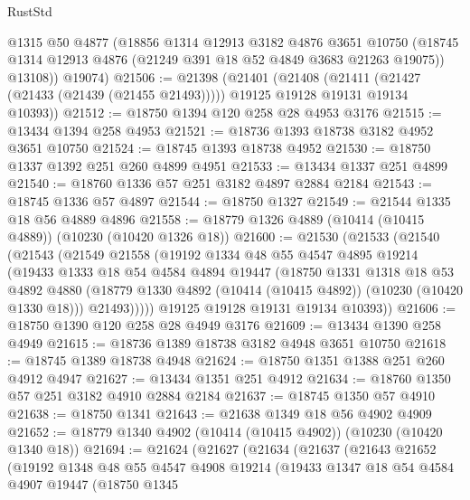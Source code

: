 \begin{lexlean}{RustStd}
\begin{coremodule}
        @1315
        @50
        @4877
        (@18856
          @1314
          @12913
          @3182
          @4876
          @3651
          @10750
          (@18745 @1314 @12913 @4876 (@21249 @391 @18 @52 @4849 @3683 @21263 @19075))
          @13108))
      @19074)
@21506 := @21398
    (@21401
      (@21408
        (@21411 (@21427 (@21433 (@21439 (@21455 @21493)))))
        @19125
        @19128
        @19131
        @19134
        @10393))
@21512 := @18750 @1394 @120 @258 @28 @4953 @3176
@21515 := @13434 @1394 @258 @4953
@21521 := @18736 @1393 @18738 @3182 @4952 @3651 @10750
@21524 := @18745 @1393 @18738 @4952
@21530 := @18750 @1337 @1392 @251 @260 @4899 @4951
@21533 := @13434 @1337 @251 @4899
@21540 := @18760 @1336 @57 @251 @3182 @4897 @2884 @2184
@21543 := @18745 @1336 @57 @4897
@21544 := @18750 @1327
@21549 := @21544 @1335 @18 @56 @4889 @4896
@21558 := @18779 @1326 @4889 (@10414 (@10415 @4889)) (@10230 (@10420 @1326 @18))
@21600 := @21530
    (@21533
      (@21540
        (@21543
          (@21549
            @21558
            (@19192
              @1334
              @48
              @55
              @4547
              @4895
              @19214
              (@19433
                @1333
                @18
                @54
                @4584
                @4894
                @19447
                (@18750
                  @1331
                  @1318
                  @18
                  @53
                  @4892
                  @4880
                  (@18779 @1330 @4892 (@10414 (@10415 @4892)) (@10230 (@10420 @1330 @18)))
                  @21493)))))
        @19125
        @19128
        @19131
        @19134
        @10393))
@21606 := @18750 @1390 @120 @258 @28 @4949 @3176
@21609 := @13434 @1390 @258 @4949
@21615 := @18736 @1389 @18738 @3182 @4948 @3651 @10750
@21618 := @18745 @1389 @18738 @4948
@21624 := @18750 @1351 @1388 @251 @260 @4912 @4947
@21627 := @13434 @1351 @251 @4912
@21634 := @18760 @1350 @57 @251 @3182 @4910 @2884 @2184
@21637 := @18745 @1350 @57 @4910
@21638 := @18750 @1341
@21643 := @21638 @1349 @18 @56 @4902 @4909
@21652 := @18779 @1340 @4902 (@10414 (@10415 @4902)) (@10230 (@10420 @1340 @18))
@21694 := @21624
    (@21627
      (@21634
        (@21637
          (@21643
            @21652
            (@19192
              @1348
              @48
              @55
              @4547
              @4908
              @19214
              (@19433
                @1347
                @18
                @54
                @4584
                @4907
                @19447
                (@18750
                  @1345

\end{coremodule}
\end{lexlean}
